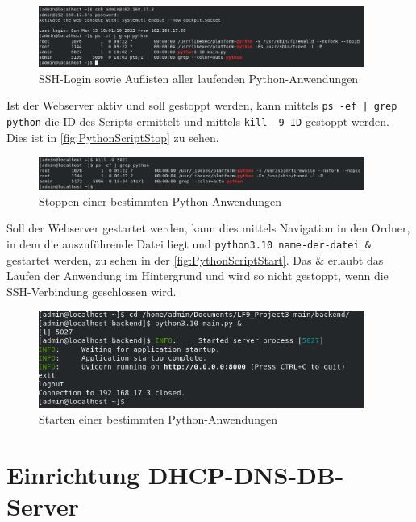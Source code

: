 \documentclass[a4paper,
    11pt,
    headings=small,
    ngerman,
    listof=totoc,
    numbers=noenddot]{scrreprt}[2021/11/13]
\begin{document}
\begin{figure}[htbp]
  \centering
  \includegraphics[width=0.95\textwidth]{data/py-script-running.png}
  \caption{\ac{SSH}-Login sowie Auflisten aller laufenden Python-Anwendungen}
  \label{fig:PythonScriptRunning}
\end{figure}

Ist der Webserver aktiv und soll gestoppt werden, kann mittels \texttt{ps -ef | grep python} die ID des Scripts ermittelt und mittels \texttt{kill -9 ID} gestoppt werden. Dies ist in \vref{fig:PythonScriptStop} zu sehen.

\begin{figure}[htbp]
  \centering
  \includegraphics[width=0.95\textwidth]{data/py-script-admin-stop.png}
  \caption{Stoppen einer bestimmten Python-Anwendungen}
  \label{fig:PythonScriptStop}
\end{figure}

Soll der Webserver gestartet werden, kann dies mittels Navigation in den Ordner, in dem die auszuführende Datei liegt und \texttt{python3.10 name-der-datei \&} gestartet werden, zu sehen in der \vref{fig:PythonScriptStart}. Das \& erlaubt das Laufen der Anwendung im Hintergrund und wird so nicht gestoppt, wenn die \ac{SSH}-Verbindung geschlossen wird.

\begin{figure}[htbp]
  \centering
  \includegraphics[width=0.95\textwidth]{data/py-script-admin-start.png}
  \caption{Starten einer bestimmten Python-Anwendungen}
  \label{fig:PythonScriptStart}
\end{figure}



\section{Einrichtung DHCP-DNS-DB-Server}
\end{document}
